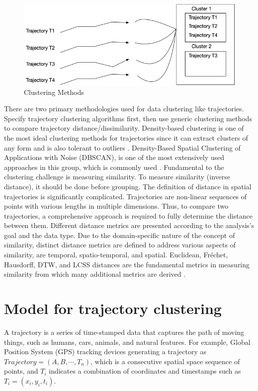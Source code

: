 \documentclass[a4paper, 12pt]{article}
\begin{document}
\begin{figure}[ht]
    \centering
    \includegraphics[width=1\textwidth]{Cluster Methods.png}
    \caption{Clustering Methods}
    \label{fig2}
\end{figure}

There are two primary methodologies used for data clustering like trajectories. Specify trajectory clustering algorithms first, then use generic clustering methods to compare trajectory distance/dissimilarity. Density-based clustering \citep{kriegel2011density} is one of the most ideal clustering methods for trajectories since it can extract clusters of any form and is also tolerant to outliers \citep{ester1996density}. Density-Based Spatial Clustering of Applications with Noise (DBSCAN), is one of the most extensively used approaches in this group, which is commonly used \citep{zhao2019trajectory,cheng2018density,chen2011clustering,lee2007trajectory}. Fundamental to the clustering challenge is measuring similarity. To measure similarity (inverse distance), it should be done before grouping. The definition of distance in spatial trajectories is significantly complicated. Trajectories are non-linear sequences of points with various lengths in multiple dimensions. Thus, to compare two trajectories, a comprehensive approach is required to fully determine the distance between them. Different distance metrics are presented according to the analysis's goal and the data type. Due to the domain-specific nature of the concept of similarity, distinct distance metrics are defined to address various aspects of similarity, are temporal, spatio-temporal, and spatial. Euclidean, Fréchet, Hausdorff, DTW, and LCSS distances are the fundamental metrics in measuring similarity from which many additional metrics are derived \citep{abbaspour2017method,aghabozorgi2015time,wang2013effectiveness}.

\section{Model for trajectory clustering}
A trajectory is a series of time-stamped data that captures the path of moving things, such as humans, cars, animals, and natural features. For example, Global Position System (GPS) tracking devices generating a trajectory as $Trajectory=(A,B,\cdots,T_{n})$, which is a consecutive spatial space sequence of points, and $T_{i}$ indicates a combination of coordinates and timestamps such as $T_i=(x_{i},y_{i},t_{i})$.
\end{document}
